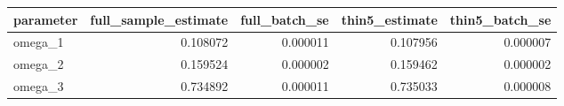 \begin{tabular}{lrrrr}
\toprule
parameter & full\_sample\_estimate & full\_batch\_se & thin5\_estimate & thin5\_batch\_se \\
\midrule
omega\_1 & 0.108072 & 0.000011 & 0.107956 & 0.000007 \\
omega\_2 & 0.159524 & 0.000002 & 0.159462 & 0.000002 \\
omega\_3 & 0.734892 & 0.000011 & 0.735033 & 0.000008 \\
\bottomrule
\end{tabular}
